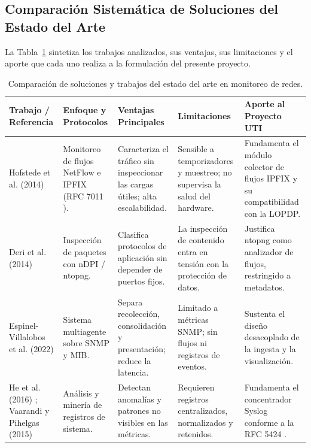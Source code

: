 \subsection{Comparación Sistemática de Soluciones del Estado del Arte}

La Tabla~\ref{tab:estado_arte} sintetiza los trabajos analizados, sus ventajas, sus limitaciones y el aporte que cada uno realiza a la formulación del presente proyecto.

\begin{table}[htbp]
  \centering
  \footnotesize
  \caption{Comparación de soluciones y trabajos del estado del arte en monitoreo de redes.}
  \label{tab:estado_arte}
  \renewcommand{\arraystretch}{1.1}
  \setlength{\tabcolsep}{2.5pt}
  \begin{tabular}{|p{2.1cm}|p{2.3cm}|p{2.8cm}|p{2.8cm}|p{2.8cm}|}
    \hline
    \textbf{Trabajo / Referencia} & \textbf{Enfoque y Protocolos} & \textbf{Ventajas Principales} & \textbf{Limitaciones} & \textbf{Aporte al Proyecto UTI} \\
    \hline
    Hofstede et al. (2014) \cite{hofstede2014flow} & Monitoreo de flujos NetFlow e IPFIX (RFC 7011 \cite{claise2013ipfix}). & Caracteriza el tráfico sin inspeccionar las cargas útiles; alta escalabilidad. & Sensible a temporizadores y muestreo; no supervisa la salud del hardware. & Fundamenta el módulo colector de flujos IPFIX y su compatibilidad con la LOPDP. \\
    \hline
    Deri et al. (2014) \cite{deri2014ndpi} & Inspección de paquetes con nDPI / ntopng. & Clasifica protocolos de aplicación sin depender de puertos fijos. & La inspección de contenido entra en tensión con la protección de datos. & Justifica ntopng como analizador de flujos, restringido a metadatos. \\
    \hline
    Espinel-Villalobos et al. (2022) \cite{espinel2022design} & Sistema multiagente sobre SNMP y MIB. & Separa recolección, consolidación y presentación; reduce la latencia. & Limitado a métricas SNMP; sin flujos ni registros de eventos. & Sustenta el diseño desacoplado de la ingesta y la visualización. \\
    \hline
    He et al. (2016) \cite{he2016experience}; Vaarandi y Pihelgas (2015) \cite{vaarandi2015logcluster} & Análisis y minería de registros de sistema. & Detectan anomalías y patrones no visibles en las métricas. & Requieren registros centralizados, normalizados y retenidos. & Fundamenta el concentrador Syslog conforme a la RFC 5424 \cite{gerhards2009syslog}. \\

\end{tabular}
\end{table}
